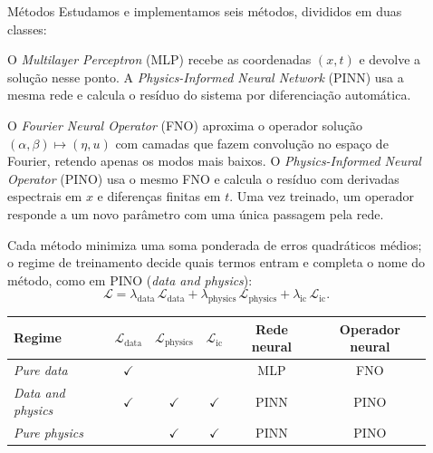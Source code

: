 \documentclass[final]{beamer}
\newlength{\sepwidth}
\newlength{\colwidth}
\newcommand{\separatorcolumn}{\begin{column}{\sepwidth}\end{column}}
\begin{document}
\begin{frame}[t]
\begin{columns}[t]
\begin{column}{\colwidth}
\end{column}

\separatorcolumn

\begin{column}{\colwidth}

  \begin{block}{Métodos}
    Estudamos e implementamos seis métodos, divididos em duas classes:

    O \textcolor{UniBlue}{\textit{Multilayer Perceptron} (MLP)} recebe as coordenadas $(x,t)$ e devolve a solução nesse ponto. A \textcolor{UniBlue}{\textit{Physics-Informed Neural Network} (PINN)} \cite{raissi2019} usa a mesma rede e calcula o resíduo do sistema por diferenciação automática.

    O \textcolor{UniBlue}{\textit{Fourier Neural Operator} (FNO)} \cite{li2021} aproxima o operador solução $(\alpha,\beta) \mapsto (\eta,u)$ com camadas que fazem convolução no espaço de Fourier, retendo apenas os modos mais baixos. O \textcolor{UniBlue}{\textit{Physics-Informed Neural Operator} (PINO)} \cite{li2023pino} usa o mesmo FNO e calcula o resíduo com derivadas espectrais em $x$ e diferenças finitas em $t$. Uma vez treinado, um operador responde a um novo parâmetro com uma única passagem pela rede.

    Cada método minimiza uma soma ponderada de erros quadráticos médios; o regime de treinamento decide quais termos entram e completa o nome do método, como em PINO (\textit{data and physics}):
    \begin{equation*}
      \mathcal{L} = \lambda_{\text{data}}\,\mathcal{L}_{\text{data}} + \lambda_{\text{physics}}\,\mathcal{L}_{\text{physics}} + \lambda_{\text{ic}}\,\mathcal{L}_{\text{ic}}.
    \end{equation*}

    \begin{table}
      \centering
      \begin{tabular}{lccccc}
        \toprule
        \textbf{Regime} & $\mathcal{L}_{\text{data}}$ & $\mathcal{L}_{\text{physics}}$ & $\mathcal{L}_{\text{ic}}$ & \textbf{Rede neural} & \textbf{Operador neural} \\
        \midrule
        \textit{Pure data}        & $\checkmark$ &              &              & MLP  & FNO  \\
        \textit{Data and physics} & $\checkmark$ & $\checkmark$ & $\checkmark$ & PINN & PINO \\
        \textit{Pure physics}     &              & $\checkmark$ & $\checkmark$ & PINN & PINO \\
        \bottomrule
      \end{tabular}
    \end{table}
  \end{block}


\end{column}
\end{columns}
\end{frame}
\end{document}
